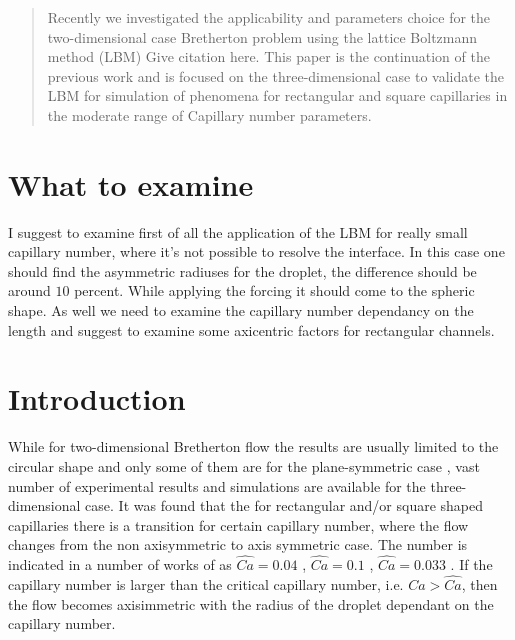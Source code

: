 \documentclass{article}
\begin{document}
\begin{abstract}
Recently we investigated the applicability and parameters choice for the two-dimensional case
Bretherton problem using the lattice Boltzmann method (LBM) {\color{red} Give citation here}. This
paper is the continuation of the previous work and is focused on the three-dimensional case to
validate the LBM for simulation of phenomena for rectangular and square capillaries in the
moderate range of Capillary number parameters. 
\end{abstract}
\section{What to examine}
I suggest to examine first of all the application of the LBM for really small capillary number,
where it's not possible to resolve the interface. In this case one should find the asymmetric
radiuses for the droplet, the difference should be around $10$ percent. While applying the forcing
it should come to the spheric shape. As well we need to examine the capillary number dependancy on
the length and suggest to examine some axicentric factors for rectangular channels.

\section{Introduction}
While for two-dimensional Bretherton flow the results are usually limited to the circular shape and
only some of them are for the plane-symmetric case \cite{giavedoni-numerical,heil-bretherton},
vast number of experimental results and simulations are available for the three-dimensional case.
It was found that the for rectangular and/or square shaped capillaries there is a transition for
certain capillary number, where the flow changes from the non axisymmetric to axis symmetric case.
The number is indicated in a number of works of as $\hat{Ca}=0.04$ \cite{cerro-bubble-train},
$\hat{Ca}=0.1$
\cite{cerro-space}, $\hat{Ca}=0.033$ \cite{heil-threedim}. If the capillary number is larger than
the critical capillary number, i.e. $Ca>\hat{Ca}$, then the flow becomes axisimmetric with the
radius of the droplet dependant on the capillary number.
\end{document}
